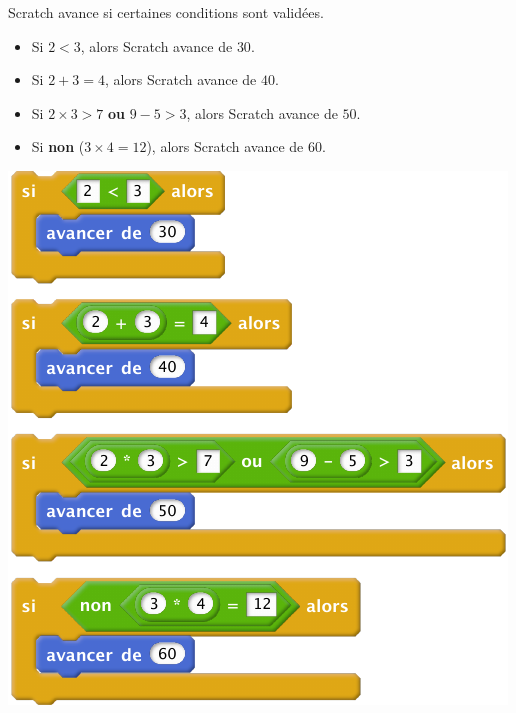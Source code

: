 \documentclass[class=report,crop=false, 12pt]{standalone}
\begin{document}
\begin{enigme}

Scratch avance si certaines conditions sont validées.

\medskip

\begin{minipage}{0.49\textwidth}
\begin{itemize}
  \item Si \og{}$2<3$\fg{}, alors Scratch avance de $30$.
  
\vspace*{6ex}  
  
  \item Si \og{}$2+3=4$\fg{}, alors Scratch avance de $40$.
  
\vspace*{6ex}    
  
  \item Si \og{}$2 \times 3 > 7$ \textbf{ou} $9-5 > 3$\fg{}, alors Scratch avance de $50$. 
  
\vspace*{6ex}    
     
  \item Si \og{}\textbf{non} ($3 \times 4 = 12$)\fg{}, alors Scratch avance de $60$. 
\end{itemize}   
\end{minipage}
\begin{minipage}{0.49\textwidth}
\begin{center}
  \includegraphics[scale=\scalebloc,scale=0.8]{code-04-eg3}
\end{center}
\end{minipage}


\end{enigme}
\end{document}
